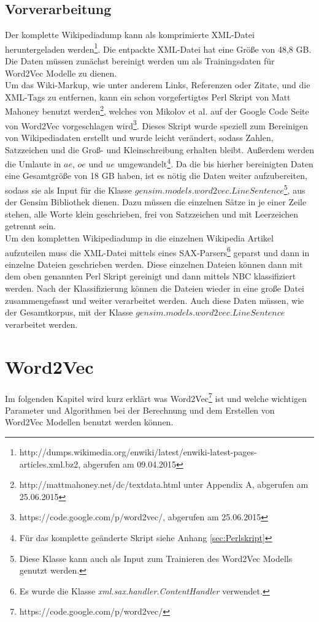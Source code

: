 \documentclass[12pt,a4paper]{report}
\begin{document}
	\section{Vorverarbeitung}
	\label{sec:Vorverarbeitung}
	Der komplette Wikipediadump kann als komprimierte XML-Datei heruntergeladen werden\footnote{http://dumps.wikimedia.org/enwiki/latest/enwiki-latest-pages-articles.xml.bz2, abgerufen am 09.04.2015}. Die entpackte XML-Datei hat eine Größe von 48,8 GB. Die Daten müssen zunächst bereinigt werden um als Trainingsdaten für Word2Vec Modelle zu dienen.\\		
	Um das Wiki-Markup, wie unter anderem Links, Referenzen oder Zitate, und die XML-Tags zu entfernen, kann ein schon vorgefertigtes Perl Skript von Matt Mahoney benutzt werden\footnote{http://mattmahoney.net/dc/textdata.html unter Appendix A, abgerufen am 25.06.2015}, welches von Mikolov et al. auf der Google Code Seite von Word2Vec vorgeschlagen wird\footnote{https://code.google.com/p/word2vec/, abgerufen am 25.06.2015}. Dieses Skript wurde speziell zum Bereinigen von Wikipediadaten erstellt und wurde leicht verändert, sodass Zahlen, Satzzeichen und die Groß- und Kleinschreibung erhalten bleibt. Außerdem werden die Umlaute in $ae$, $oe$ und $ue$ umgewandelt\footnote{Für das komplette geänderte Skript siehe Anhang \ref{sec:Perlskript}}. Da die bis hierher bereinigten Daten eine Gesamtgröße von 18 GB haben, ist es nötig die Daten weiter aufzubereiten, sodass sie als Input für die Klasse $gensim.models.word2vec.LineSentence$\footnote{Diese Klasse kann auch als Input zum Trainieren des Word2Vec Modells genutzt werden.}, aus der Gensim Bibliothek dienen. Dazu müssen die einzelnen Sätze in je einer Zeile stehen, alle Worte klein geschrieben, frei von Satzzeichen und mit Leerzeichen getrennt sein.\\
	
	Um den kompletten Wikipediadump in die einzelnen Wikipedia Artikel aufzuteilen muss die XML-Datei mittels eines SAX-Parsers\footnote{Es wurde die Klasse \textit{xml.sax.handler.ContentHandler} verwendet.} geparst und dann in einzelne Dateien geschrieben werden. Diese einzelnen Dateien können dann mit dem oben genannten Perl Skript gereinigt und dann mittels NBC klassifiziert werden. Nach der Klassifizierung können die Dateien wieder in eine große Datei zusammengefasst und weiter verarbeitet werden. Auch diese Daten müssen, wie der Gesamtkorpus, mit der Klasse $gensim.models.word2vec.LineSentence$ verarbeitet werden.
\newpage
\chapter{Word2Vec}
Im folgenden Kapitel wird kurz erklärt was Word2Vec\footnote{https://code.google.com/p/word2vec/} ist und welche wichtigen Parameter und Algorithmen bei der Berechnung und dem Erstellen von Word2Vec Modellen benutzt werden können.\\
\end{document}
